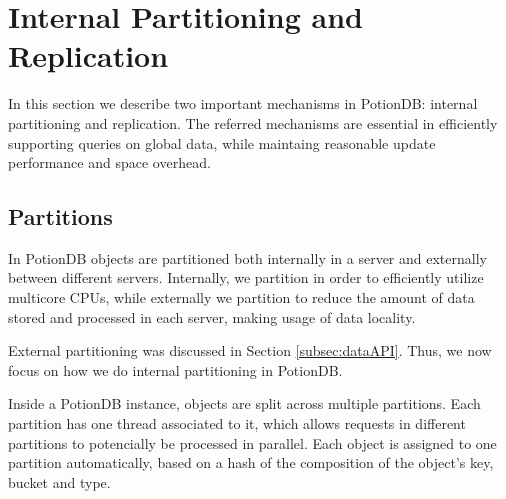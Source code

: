\documentclass{vldb}
\newcommand{\grumbler}[2]{{\color{red}{\bf #1:} #2}}
\renewcommand{\grumbler}[2]{}
\newcommand{\andre}[1]{\grumbler{andre}{#1}}
\begin{document}
\section{Internal Partitioning and Replication}

In this section we describe two important mechanisms in PotionDB: internal partitioning and replication.
The referred mechanisms are essential in efficiently supporting queries on global data, while maintaing reasonable update performance and space overhead.

\subsection{Partitions}

\andre{I've decided to, for now, use here the terms partition/sharding for, respectively, internal \& external partitioning. Maybe I should do the same in previous sections (namely Section 4)?}

In PotionDB objects are partitioned both internally in a server and externally between different servers.
Internally, we partition in order to efficiently utilize multicore CPUs, while externally we partition to reduce the amount of data stored and processed in each server, making usage of data locality.

External partitioning was discussed in Section \ref{subsec:dataAPI}.
Thus, we now focus on how we do internal partitioning in PotionDB.


Inside a PotionDB instance, objects are split across multiple partitions.
Each partition has one thread associated to it, which allows requests in different partitions to potencially be processed in parallel. 
Each object is assigned to one partition automatically, based on a hash of the composition of the object's key, bucket and type.
\end{document}
